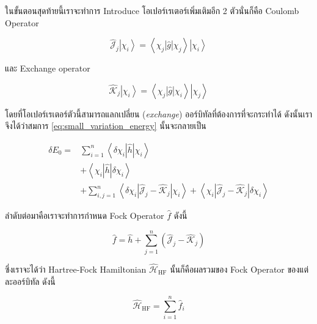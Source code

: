 ในขั้นตอนสุดท้ายนี้เราจะทำการ Introduce โอเปอร์เรเตอร์เพิ่มเติมอีก 2 ตัวนั่นก็คือ Coulomb Operator

\begin{equation}
    \label{eq:coulomb_operator}
    \hat{\mathscr{J}}_j\left|\chi_i\right\rangle  
    = \left\langle\chi_j|\hat{g}| \chi_j\right\rangle
        \left|\chi_i\right\rangle
\end{equation}

\noindent และ Exchange operator

\begin{equation}
    \label{eq:exchange_operator}
    \hat{\mathscr{K}}_j\left|\chi_i\right\rangle 
    = \left\langle\chi_j|\hat{g}| \chi_i\right\rangle
        \left|\chi_j\right\rangle
\end{equation}

\noindent โดยที่โอเปอร์เรเตอร์ตัวนี้สามารถแลกเปลี่ยน (\textit{exchange}) ออร์บิทัลที่ต้องการที่จะกระทำได้ ดังนั้นเราจึงได้ว่าสมการ 
\ref{eq:small_variation_energy} นั้นจะกลายเป็น

\begin{equation}
    \begin{aligned}
        \delta E_0 
        = & \sum_{i=1}^n\left\langle\delta \chi_i|\hat{h}| \chi_i\right\rangle \\
        & +\left\langle\chi_i|\hat{h}| \delta \chi_i\right\rangle \\
        & +\sum_{i, j=1}^n
            \left\langle
                \delta \chi_i
                \left|\hat{\mathscr{J}}_j-\hat{\mathscr{K}}_j\right| 
                \chi_i
            \right\rangle 
            + \left\langle
                \chi_i\left
                |\hat{\mathscr{J}}_j-\hat{\mathscr{K}}_j\right| 
                \delta \chi_i
            \right\rangle 
    \end{aligned}
\end{equation}

ลำดับต่อมาคือเราจะทำการกำหนด Fock Operator $\hat{f}$ ดังนี้

\begin{equation}
    \label{eq:fock_operator}
    \hat{f} 
    = \hat{h} 
    + \sum_{j=1}^n\left(\hat{\mathscr{J}}_j-\hat{\mathscr{K}}_j\right)
\end{equation}

\noindent ซึ่งเราจะได้ว่า Hartree-Fock Hamiltonian $\hat{\mathcal{H}}_{\mathrm{HF}}$ นั้นก็คือผลรวมของ Fock Operator 
ของแต่ละออร์บิทัล ดังนี้

\begin{equation}
    \label{eq:total_HF_hamiltonian}
    \hat{\mathscr{H}}_{\mathrm{HF}} = \sum_{i=1}^n \hat{f}_i
\end{equation}

